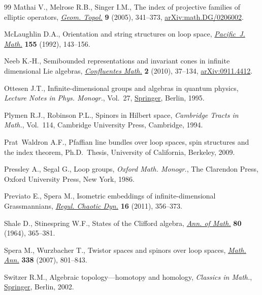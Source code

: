 \documentclass[10pt,a4paper]{amsart}
\numberwithin{equation}{section}
\begin{document}
\begin{thebibliography}{99}
Mathai V., Melrose R.B., Singer I.M., The index of projective families of
 elliptic operators,  \href{https://doi.org/10.2140/gt.2005.9.341}{\textit{Geom. Topol.}} \textbf{9} (2005), 341--373,
 \href{https://arxiv.org/abs/math.DG/0206002}{arXiv:math.DG/0206002}.

McLaughlin D.A., Orientation and string structures on loop space,
 \href{https://doi.org/10.2140/pjm.1992.155.143}{\textit{Pacific~J. Math.}} \textbf{155} (1992), 143--156.

Neeb K.-H., Semibounded representations and invariant cones in infinite
 dimensional {L}ie algebras, \href{https://doi.org/10.1142/S1793744210000132}{\textit{Confluentes Math.}} \textbf{2} (2010),
 37--134, \href{https://arxiv.org/abs/0911.4412}{arXiv:0911.4412}.

Ottesen J.T., Infinite-dimensional groups and algebras in quantum physics,
 \textit{Lecture Notes in Phys. Monogr.}, Vol.~27,  \href{https://doi.org/10.1007/978-3-540-49141-5}{Springer}, Berlin, 1995.

Plymen R.J., Robinson P.L., Spinors in {H}ilbert space, \textit{Cambridge
 Tracts in Math.}, Vol.~114, Cambridge University Press, Cambridge, 1994.

Prat~Waldron A.F., Pfaffian line bundles over loop spaces, spin structures and
 the index theorem, Ph.D.~Thesis, {U}niversity of {C}alifornia, {B}erkeley,
 2009.

Pressley A., Segal G., Loop groups, \textit{Oxford Math. Monogr.}, The Clarendon Press,
 Oxford University Press, New York, 1986.

Previato E., Spera M., Isometric embeddings of infinite-dimensional
 {G}rassmannians, \href{https://doi.org/10.1134/S1560354711030099}{\textit{Regul. Chaotic Dyn.}} \textbf{16} (2011), 356--373.

Shale D., Stinespring W.F., States of the {C}lifford algebra, \href{https://doi.org/10.2307/1970397}{\textit{Ann. of
 Math.}} \textbf{80} (1964), 365--381.

Spera M., Wurzbacher T., Twistor spaces and spinors over loop spaces,
  \href{https://doi.org/10.1007/s00208-007-0085-3}{\textit{Math. Ann.}} \textbf{338} (2007), 801--843.

Switzer R.M., Algebraic topology---homotopy and homology, \textit{Classics in Math.},
  \href{https://doi.org/10.1007/978-3-642-61923-6}{Springer}, Berlin, 2002.


\end{thebibliography}
\end{document}
